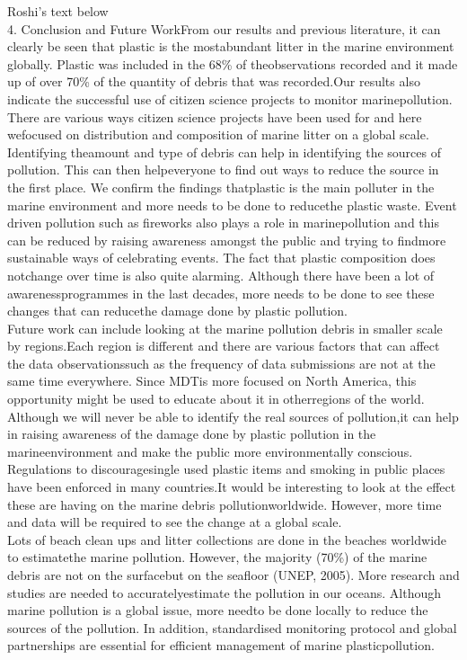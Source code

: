 \documentclass[10pt]{article}\usepackage[]{graphicx}\usepackage[]{color}
\begin{document}
Roshi's text below\\
4. Conclusion and Future WorkFrom our results and previous literature, it can clearly be seen that plastic is the mostabundant litter in the marine environment globally. Plastic was included in the 68\% of theobservations recorded and it made up of over 70\% of the quantity of debris that was recorded.Our results also indicate the successful use of citizen science projects to monitor marinepollution. There are various ways citizen science projects have been used for and here wefocused on distribution and composition of marine litter on a global scale. Identifying theamount and type of debris can help in identifying the sources of pollution. This can then helpeveryone to find out ways to reduce the source in the first place. We confirm the findings thatplastic is the main polluter in the marine environment and more needs to be done to reducethe plastic waste. Event driven pollution such as fireworks also plays a role in marinepollution and this can be reduced by raising awareness amongst the public and trying to findmore sustainable ways of celebrating events. The fact that plastic composition does notchange over time is also quite alarming. Although there have been a lot of awarenessprogrammes in the last decades, more needs to be done to see these changes that can reducethe damage done by plastic pollution.  \\

Future work can include looking at the marine pollution debris in smaller scale by regions.Each region is different and there are various factors that can affect the data observationssuch as the frequency of data submissions are not at the same time everywhere.  Since MDTis more focused on North America, this opportunity might be used to educate about it in otherregions of the world. Although we will never be able to identify the real sources of pollution,it can help in raising awareness of the damage done by plastic pollution in the marineenvironment and make the public more environmentally conscious. Regulations to discouragesingle used plastic items and smoking in public places have been enforced in many countries.It would be interesting to look at the effect these are having on the marine debris pollutionworldwide. However, more time and data will be required to see the change at a global scale. \\

Lots of beach clean ups and litter collections are done in the beaches worldwide to estimatethe marine pollution. However, the majority (70\%) of the marine debris are not on the surfacebut on the seafloor  (UNEP, 2005).  More research and studies are needed to accuratelyestimate the pollution in our oceans. Although marine pollution is a global issue, more needto be done locally to reduce the sources of the pollution. In addition, standardised monitoring protocol and global partnerships are   essential for efficient management of marine plasticpollution. \\
\end{document}

